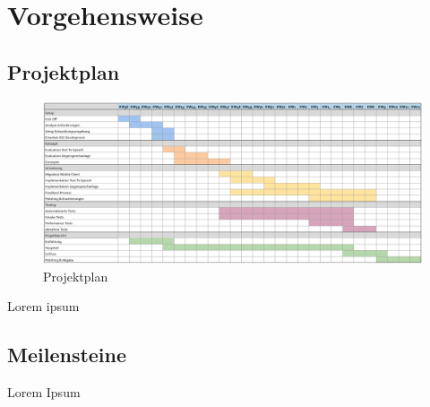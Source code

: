 \section{Vorgehensweise}

\subsection*{Projektplan}

\begin{figure}[h]
    \centering
    \begin{minipage}[b]{\textwidth}
        \includegraphics[width=\textwidth]{graphics/projektplan}
        \caption{Projektplan}
    \end{minipage}\label{fig:projektplan}
\end{figure}

Lorem ipsum
\clearpage

\subsection*{Meilensteine}

Lorem Ipsum

\clearpage
